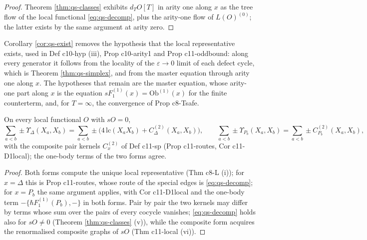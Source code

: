 \begin{proof}
Theorem \ref{thm:qs-classes} exhibits $d_TO[T]$ in arity one along $x$ as the tree flow of the local functional \eqref{eq:qs-decomp}, plus the arity-one flow of $L(O)^{(0)}$; the latter exists by the same argument at arity zero.
\end{proof}

\begin{remark}
\label{rem:qs-hyp}
Corollary \ref{cor:qs-exist} removes the hypothesis that the local representative exists, used in Def c10-hyp (iii), Prop c10-arity1 and Prop c11-oddbound: along every generator it follows from the locality of the $\varepsilon\to0$ limit of each defect cycle, which is Theorem \ref{thm:qs-simplex}, and from the master equation through arity one along $x$. The hypotheses that remain are the master equation, whose arity-one part along $x$ is the equation $sF_1^{(1)}(x)=\mathrm{Ob}^{(1)}(x)$ for the finite counterterm, and, for $T=\infty$, the convergence of Prop c8-Tsafe.
\end{remark}

\begin{corollary}
\label{cor:qs-DP}
On every local functional $O$ with $sO=0$,
\[
\sum_{a<b}\pm\Upsilon_\Delta(X_a,X_b)=\sum_{a<b}\pm\big(4\,\mathrm{lc}(X_aX_b)+C^{(2)}_\Delta(X_a,X_b)\big),\qquad \sum_{a<b}\pm\Upsilon_{P_b}(X_a,X_b)=\sum_{a<b}\pm C^{(2)}_{P_b}(X_a,X_b),
\] with the composite pair kernels $C^{(2)}_x$ of Def c11-sp (Prop c11-routes, Cor c11-D1local); the one-body terms of the two forms agree.
\end{corollary}

\begin{proof}
Both forms compute the unique local representative (Thm c8-L (i)); for $x=\Delta$ this is Prop c11-routes, whose route of the special edges is \eqref{eq:qs-decomp}; for $x=P_b$ the same argument applies, with Cor c11-D1local and the one-body term $-\{\hbar F_1^{(1)}(P_b),-\}$ in both forms. Pair by pair the two kernels may differ by terms whose sum over the pairs of every cocycle vanishes; \eqref{eq:qs-decomp} holds also for $sO\neq0$ (Theorem \ref{thm:qs-classes} (v)), while the composite form acquires the renormalised composite graphs of $sO$ (Thm c11-local (vi)).
\end{proof}

